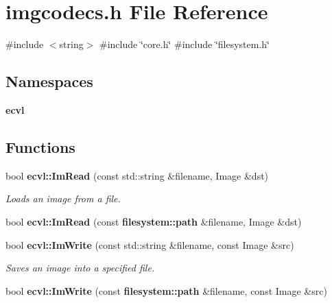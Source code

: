 \section{imgcodecs.\+h File Reference}
\label{imgcodecs_8h}
{\ttfamily \#include $<$string$>$}\newline
{\ttfamily \#include \char`\"{}core.\+h\char`\"{}}\newline
{\ttfamily \#include \char`\"{}filesystem.\+h\char`\"{}}\newline
\subsection*{Namespaces}
\begin{DoxyCompactItemize}
\item 
 \textbf{ ecvl}
\end{DoxyCompactItemize}
\subsection*{Functions}
\begin{DoxyCompactItemize}
\item 
bool \textbf{ ecvl\+::\+Im\+Read} (const std\+::string \&filename, Image \&dst)
\begin{DoxyCompactList}\small\item\em Loads an image from a file. \end{DoxyCompactList}\item 
bool \textbf{ ecvl\+::\+Im\+Read} (const \textbf{ filesystem\+::path} \&filename, Image \&dst)
\item 
bool \textbf{ ecvl\+::\+Im\+Write} (const std\+::string \&filename, const Image \&src)
\begin{DoxyCompactList}\small\item\em Saves an image into a specified file. \end{DoxyCompactList}\item 
bool \textbf{ ecvl\+::\+Im\+Write} (const \textbf{ filesystem\+::path} \&filename, const Image \&src)
\end{DoxyCompactItemize}
